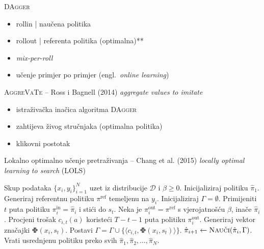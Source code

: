 \documentclass{beamer}
\newcommand{\engl}[1]{(engl.~\emph{#1})}
\begin{document}
\begin{frame}{\protect\textsc{DAgger}}
  \begin{itemize}
  \item rollin | naučena politika
  \item rollout | referenta politika (optimalna)**
  \item \textit{mix-per-roll}
  \item učenje primjer po primjer \engl{online learning}
  \end{itemize}
\end{frame}

\begin{frame}{\protect\textsc{AggreVaTe} -- Ross i Bagnell (2014)}
{\protect\textit{aggregate values to imitate}}
  \begin{itemize}
  \item istraživačka inačica algoritma \textsc{DAgger}
  \item zahtijeva živog stručnjaka (optimalna politika)
  \item klikovni postotak
  \end{itemize}
\end{frame}

\begin{frame}{Lokalno optimalno učenje pretraživanja -- Chang et al. (2015)}
{\protect\textit{locally optimal learning to search} (\textsc{LOLS})}
\begin{center}
\begin{algorithm}[H]
\begin{algorithmic}[1]
\Require Skup podataka $\{x_i, y_i\}_{i=1}^N$ uzet iz distribucije $\mathcal{D}$
         i $\beta \geq 0$. %
\State Inicijaliziraj politiku $\hat{\pi}_1$.
  \State Generiraj referentnu politiku $\pi^{\text{ref}}$ temeljenu na $y_i$.
  \State Inicijaliziraj $\Gamma = \emptyset$. 
    \State Primijeniti $t$ puta politiku $\pi_{i}^{\text{in}} = \hat{\pi}_i$  i stići do $s_t$. 
      \State Neka je  $\pi_{i}^{\text{out}} = \pi^{\text{ref}}$ s vjerojatnošću $\beta$, inače $\hat{\pi}_i$.
      \State Procjeni trošak $c_{i,t}(a)$ koristeći $T-t-1$ puta politiku $\pi_{i}^{\text{out}}$. 
    \EndFor
    \State Generiraj vektor značajki $\mathbf{\Phi}(x_i, s_t)$.
    \State Postavi $\Gamma = \Gamma \cup \{\langle c_{i,t}, \mathbf{\Phi}(x_i, s_t) \rangle\}$.
  \EndFor
  \State $\hat{\pi}_{i+1} \gets \textsc{Nauči}(\hat{\pi}_i, \Gamma)$.
\EndFor
\State Vrati usrednjenu politiku preko svih $\hat{\pi}_1, \hat{\pi}_2, \ldots, \hat{\pi}_N$.
\end{algorithmic}
\end{algorithm}
\end{center}
\end{frame}
\end{document}
